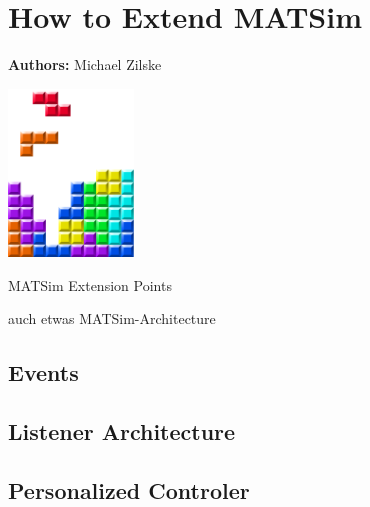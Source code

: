 \chapter{How to Extend MATSim }
\label{ch:extensionpoints}

\hfill \textbf{Authors:} Michael Zilske

\begin{center} \includegraphics[width=0.25\textwidth, angle=0]{figures/MATSimBook.png} \end{center}

MATSim Extension Points

auch etwas MATSim-Architecture


\section{Events}
\label{sec:events}

\section{Listener Architecture}

\section{Personalized Controler}


